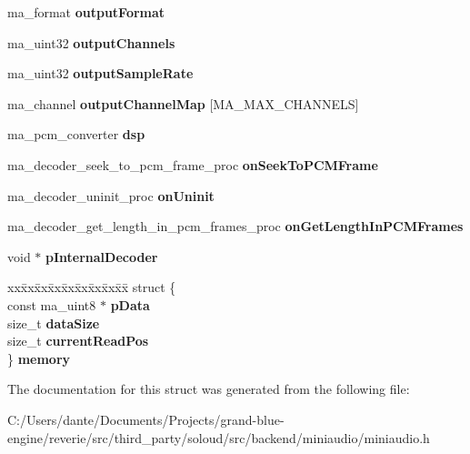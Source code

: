\begin{DoxyCompactItemize}
ma\+\_\+format {\bfseries output\+Format}
\item 
\mbox{\label{structma__decoder_a66e891518697e7226936c04cce589a8c}} 
ma\+\_\+uint32 {\bfseries output\+Channels}
\item 
\mbox{\label{structma__decoder_a9d4f0e1242f5faf1fb1614c619fbd6f0}} 
ma\+\_\+uint32 {\bfseries output\+Sample\+Rate}
\item 
\mbox{\label{structma__decoder_ac15e3aa7a88adc712435543c51bf50dc}} 
ma\+\_\+channel {\bfseries output\+Channel\+Map} \mbox{[}M\+A\+\_\+\+M\+A\+X\+\_\+\+C\+H\+A\+N\+N\+E\+LS\mbox{]}
\item 
\mbox{\label{structma__decoder_ac956e824411663c4d7e36d6531dffdd6}} 
ma\+\_\+pcm\+\_\+converter {\bfseries dsp}
\item 
\mbox{\label{structma__decoder_a3e6d2e701b2ebc204e31364919e7f93a}} 
ma\+\_\+decoder\+\_\+seek\+\_\+to\+\_\+pcm\+\_\+frame\+\_\+proc {\bfseries on\+Seek\+To\+P\+C\+M\+Frame}
\item 
\mbox{\label{structma__decoder_ac2484c604c1583b697665bd409789f6e}} 
ma\+\_\+decoder\+\_\+uninit\+\_\+proc {\bfseries on\+Uninit}
\item 
\mbox{\label{structma__decoder_a434c381c2f896b8319955f683f1b88f9}} 
ma\+\_\+decoder\+\_\+get\+\_\+length\+\_\+in\+\_\+pcm\+\_\+frames\+\_\+proc {\bfseries on\+Get\+Length\+In\+P\+C\+M\+Frames}
\item 
\mbox{\label{structma__decoder_af19fbbb327dc5d617a04a060d6ded1ac}} 
void $\ast$ {\bfseries p\+Internal\+Decoder}
\item 
\mbox{\label{structma__decoder_a2852bba60f5c0e3e549a5d2966c9a475}} 
\begin{tabbing}
xx\=xx\=xx\=xx\=xx\=xx\=xx\=xx\=xx\=\kill
struct \{\\
\>const ma\_uint8 $\ast$ {\bfseries pData}\\
\>size\_t {\bfseries dataSize}\\
\>size\_t {\bfseries currentReadPos}\\
\} {\bfseries memory}\\

\end{tabbing}\end{DoxyCompactItemize}


The documentation for this struct was generated from the following file\+:\begin{DoxyCompactItemize}
\item 
C\+:/\+Users/dante/\+Documents/\+Projects/grand-\/blue-\/engine/reverie/src/third\+\_\+party/soloud/src/backend/miniaudio/miniaudio.\+h\end{DoxyCompactItemize}
